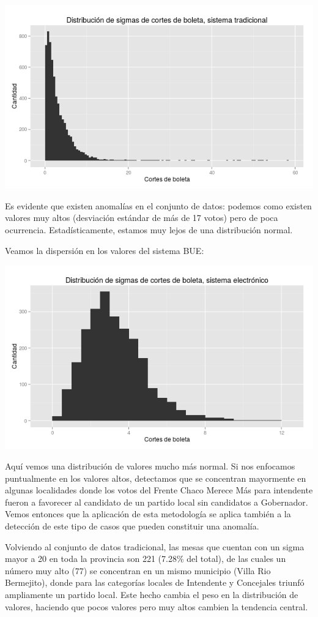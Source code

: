 \documentclass[12pt,a4paper]{article}
\begin{document}
\includegraphics[width=\textwidth]{sigmas_tradicional}

Es evidente que existen anomalías en el conjunto de datos: podemos como existen
valores muy altos (desviación estándar de más de 17 votos) pero de poca
ocurrencia. Estadísticamente, estamos muy lejos de una distribución normal.

Veamos la dispersión en los valores del sistema BUE:

\includegraphics[width=\textwidth]{sigmas_electronico}

Aquí vemos una distribución de valores mucho más normal. Si nos enfocamos
puntualmente en los valores altos, detectamos que se concentran mayormente en
algunas localidades donde los votos del Frente Chaco Merece Más para intendente
fueron a favorecer al candidato de un partido local sin candidatos a Gobernador.
Vemos entonces que la aplicación de esta metodología se aplica también a la
detección de este tipo de casos que pueden constituir una anomalía.

Volviendo al conjunto de datos tradicional, las mesas que cuentan con
un sigma mayor a 20 en toda la provincia son 221 (7.28\% del total), de las
cuales un número muy alto (77) se concentran en un mismo municipio (Villa Rio
Bermejito), donde para las categorías locales de Intendente y Concejales triunfó
ampliamente un partido local. Este hecho cambia el peso en la distribución de
valores, haciendo que pocos valores pero muy altos cambien la tendencia central.
\end{document}
